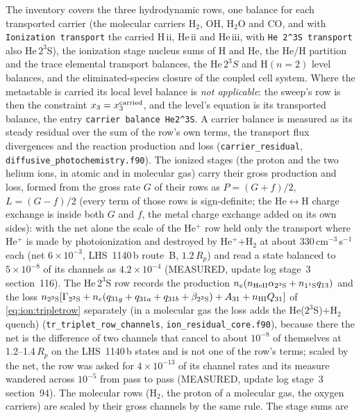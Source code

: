 The inventory covers the three hydrodynamic rows, one balance for each
transported carrier (the molecular carriers H$_2$, OH, H$_2$O and CO, and with
\texttt{Ionization transport} the carried H\,{\sc ii}, He\,{\sc ii} and
He\,{\sc iii}, with \texttt{He 2\^{}3S transport} also He\,$2^3$S), the
ionization stage nucleus sums of H and He, the He/H
partition and the trace elemental transport balances, the
$\mathrm{He}\,2^3S$ and $\mathrm{H}(n{=}2)$ level balances, and the
eliminated-species closure of the coupled cell system.  Where the metastable
is carried its local level balance is \emph{not applicable}: the sweep's row
is then the constraint $x_3 = x_3^{\rm carried}$, and the level's equation is
its transported balance, the entry \texttt{carrier balance He2\^{}3S}.  A
carrier balance is measured as its steady residual over the sum of the row's
own terms, the transport flux divergences and the reaction production and
loss (\texttt{carrier\_residual}, \texttt{diffusive\_photochemistry.f90}).
The ionized stages (the proton and the two helium ions, in atomic and in
molecular gas) carry their gross production and loss, formed from the gross
rate $G$ of their rows as $P=(G+f)/2$, $L=(G-f)/2$ (every term of those rows is
sign-definite; the He$\leftrightarrow$H charge exchange is inside both $G$
and $f$, the metal charge exchange added on its own sides): with the net
alone the scale of the He$^+$ row held only the transport where He$^+$ is
made by photoionization and destroyed by He$^+$+H$_2$ at about
330\,cm$^{-3}$\,s$^{-1}$ each (net $6\times10^{-3}$, LHS~1140\,b route~B,
$1.2\,R_p$) and read a state balanced to $5\times10^{-8}$ of its channels as
$4.2\times10^{-4}$ (MEASURED, update log stage~3 section~116). The He\,$2^3$S row
records the production $n_e(n_{\rm HeII}\alpha_{2^3{\rm S}} +
n_{1^1{\rm S}}q_{13})$ and the loss $n_{2^3{\rm S}}[\Gamma_{2^3{\rm S}} +
n_e(q_{31g}+q_{31a}+q_{31b}+\beta_{2^3{\rm S}}) + A_{31} + n_{\rm HI}Q_{31}]$
of \eqref{eq:ion:tripletrow} separately (in a molecular gas the loss adds the
He($2^3$S)$+$H$_2$ quench) (\texttt{tr\_triplet\_row\_channels},
\texttt{ion\_residual\_core.f90}), because there the net is the difference of
two channels that cancel to about $10^{-8}$ of themselves at
1.2--1.4\,$R_p$ on the LHS~1140\,b states and is not one of the row's terms; scaled by the net, the row was asked for
$4\times10^{-13}$ of its channel rates and its measure wandered across
$10^{-5}$ from pass to pass (MEASURED, update log stage~3 section~94). The
molecular rows (H$_2$, the proton of a molecular gas, the oxygen carriers)
are scaled by their gross channels by the same rule.  The stage sums are
